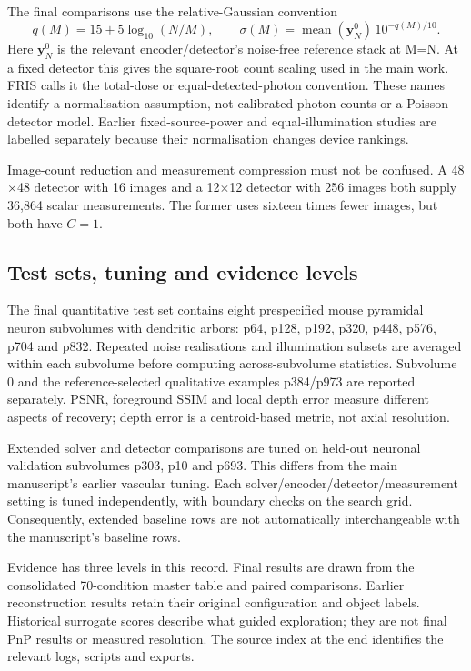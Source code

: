 The final comparisons use the relative-Gaussian convention
\[
q(M)=15+5\log_{10}(N/M),\qquad
\sigma(M)=\operatorname{mean}(\mathbf y_N^0)\,10^{-q(M)/10}.
\]
Here \(\mathbf y_N^0\) is the relevant encoder/detector's noise-free reference stack at M=N. At a fixed detector this gives the square-root count scaling used in the main work. FRIS calls it the total-dose or equal-detected-photon convention. These names identify a normalisation assumption, not calibrated photon counts or a Poisson detector model. Earlier fixed-source-power and equal-illumination studies are labelled separately because their normalisation changes device rankings.

Image-count reduction and measurement compression must not be confused. A 48\ensuremath{\times}48 detector with 16 images and a 12\ensuremath{\times}12 detector with 256 images both supply 36,864 scalar measurements. The former uses sixteen times fewer images, but both have \(C=1\).

\subsection{Test sets, tuning and evidence levels}

The final quantitative test set contains eight prespecified mouse pyramidal neuron subvolumes with dendritic arbors: p64, p128, p192, p320, p448, p576, p704 and p832. Repeated noise realisations and illumination subsets are averaged within each subvolume before computing across-subvolume statistics. Subvolume 0 and the reference-selected qualitative examples p384/p973 are reported separately. PSNR, foreground SSIM and local depth error measure different aspects of recovery; depth error is a centroid-based metric, not axial resolution.

Extended solver and detector comparisons are tuned on held-out neuronal validation subvolumes p303, p10 and p693. This differs from the main manuscript's earlier vascular tuning. Each solver/encoder/detector/measurement setting is tuned independently, with boundary checks on the search grid. Consequently, extended baseline rows are not automatically interchangeable with the manuscript's baseline rows.

Evidence has three levels in this record. Final results are drawn from the consolidated 70-condition master table and paired comparisons. Earlier reconstruction results retain their original configuration and object labels. Historical surrogate scores describe what guided exploration; they are not final PnP results or measured resolution. The source index at the end identifies the relevant logs, scripts and exports.
